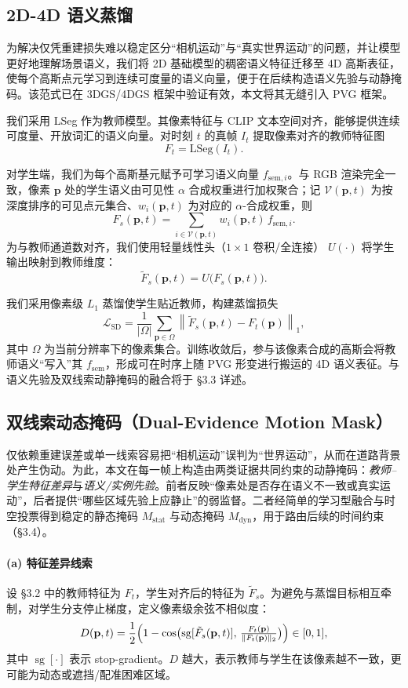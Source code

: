 \documentclass[10pt,conference]{IEEEtran} %
\begin{document}
\subsection{2D-4D 语义蒸馏}

为解决仅凭重建损失难以稳定区分“相机运动”与“真实世界运动”的问题，并让模型更好地理解场景语义，我们将 2D 基础模型的稠密语义特征迁移至 4D 高斯表征，使每个高斯点元学习到连续可度量的语义向量，便于在后续构造语义先验与动静掩码。该范式已在 3DGS/4DGS 框架中验证有效，本文将其无缝引入 PVG 框架。

我们采用 LSeg 作为教师模型。其像素特征与 CLIP 文本空间对齐，能够提供连续可度量、开放词汇的语义向量。对时刻 $t$ 的真帧 $I_t$ 提取像素对齐的教师特征图
\[
F_t=\mathrm{LSeg}(I_t).
\]

对学生端，我们为每个高斯基元赋予可学习语义向量 $f_{\text{sem},i}$。与 RGB 渲染完全一致，像素 $\mathbf p$ 处的学生语义由可见性 $\alpha$ 合成权重进行加权聚合；记 $\mathcal V(\mathbf p,t)$ 为按深度排序的可见点元集合、$w_i(\mathbf p,t)$ 为对应的 $\alpha$-合成权重，则
\begin{equation}
F_s(\mathbf p,t)=\sum_{i\in\mathcal V(\mathbf p,t)} w_i(\mathbf p,t)\,f_{\text{sem},i}.
\label{eq:feature_render}
\end{equation}
为与教师通道数对齐，我们使用轻量线性头（$1{\times}1$ 卷积/全连接） $U(\cdot)$ 将学生输出映射到教师维度：
\[
\tilde F_s(\mathbf p,t)=U\!\big(F_s(\mathbf p,t)\big).
\]

我们采用像素级 $L_1$ 蒸馏使学生贴近教师，构建蒸馏损失
\[
\mathcal{L}_{\mathrm{SD}}
=\frac{1}{|\Omega|}\sum_{\mathbf p\in\Omega}\left\|\tilde F_s(\mathbf p,t)-F_t(\mathbf p)\right\|_1,
\]
其中 $\Omega$ 为当前分辨率下的像素集合。训练收敛后，参与该像素合成的高斯会将教师语义“写入”其 $f_{\mathrm{sem}}$，形成可在时序上随 PVG 形变进行搬运的 4D 语义表征。与语义先验及双线索动静掩码的融合将于 §3.3 详述。

\subsection{双线索动态掩码（Dual-Evidence Motion Mask）}
仅依赖重建误差或单一线索容易把“相机运动”误判为“世界运动”，从而在道路背景处产生伪动。为此，本文在每一帧上构造由两类证据共同约束的动静掩码：\emph{教师–学生特征差异}与\emph{语义/实例先验}。前者反映“像素处是否存在语义不一致或真实运动”，后者提供“哪些区域先验上应静止”的弱监督。二者经简单的学习型融合与时空投票得到稳定的静态掩码 $M_{\mathrm{stat}}$ 与动态掩码 $M_{\mathrm{dyn}}$，用于路由后续的时间约束（§3.4）。

\paragraph{(a) 特征差异线索}
设 §3.2 中的教师特征为 $F_t$，学生对齐后的特征为 $\tilde F_s$。为避免与蒸馏目标相互牵制，对学生分支停止梯度，定义像素级余弦不相似度：
\begin{equation}
D(\mathbf p,t)=\frac{1}{2}\Bigl(1-\cos\bigl(\operatorname{sg}[\tilde F_s(\mathbf p,t)],\,\tfrac{F_t(\mathbf p)}{\|F_t(\mathbf p)\|_2}\bigr)\Bigr)\in[0,1],
\label{eq:demm_diff}
\end{equation}
其中 $\operatorname{sg}[\cdot]$ 表示 stop-gradient。$D$ 越大，表示教师与学生在该像素越不一致，更可能为动态或遮挡/配准困难区域。
\end{document}
